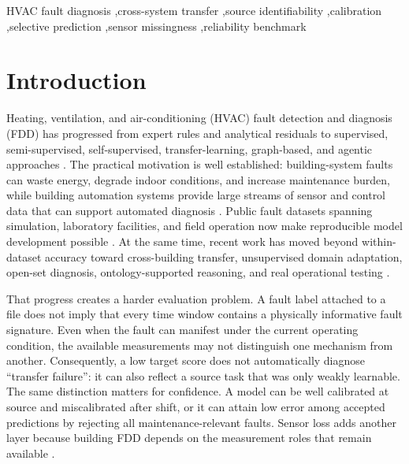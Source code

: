 \documentclass[preprint,12pt]{elsarticle}
\begin{document}
\begin{frontmatter}
\begin{abstract}
\end{abstract}

\begin{keyword}
HVAC fault diagnosis \sep cross-system transfer \sep source identifiability \sep calibration \sep selective prediction \sep sensor missingness \sep reliability benchmark
\end{keyword}

\end{frontmatter}

\section{Introduction}
Heating, ventilation, and air-conditioning (HVAC) fault detection and diagnosis (FDD) has progressed from expert rules and analytical residuals to supervised, semi-supervised, self-supervised, transfer-learning, graph-based, and agentic approaches \cite{katipamula2005a,katipamula2005b,kim2018review,mirnaghi2020review,chen2022review,chen2023review,bi2024review}. The practical motivation is well established: building-system faults can waste energy, degrade indoor conditions, and increase maintenance burden, while building automation systems provide large streams of sensor and control data that can support automated diagnosis \cite{shi2019review,andersen2024barriers}. Public fault datasets spanning simulation, laboratory facilities, and field operation now make reproducible model development possible \cite{granderson2023dataset}. At the same time, recent work has moved beyond within-dataset accuracy toward cross-building transfer, unsupervised domain adaptation, open-set diagnosis, ontology-supported reasoning, and real operational testing \cite{lei2025,zhang2025source,ghalamsiah2025can,ghalamsiah2026graph,gao2026open,li2026agentic,wang2026cross,mosteiro2026dbn}.

That progress creates a harder evaluation problem. A fault label attached to a file does not imply that every time window contains a physically informative fault signature. Even when the fault can manifest under the current operating condition, the available measurements may not distinguish one mechanism from another. Consequently, a low target score does not automatically diagnose ``transfer failure'': it can also reflect a source task that was only weakly learnable. The same distinction matters for confidence. A model can be well calibrated at source and miscalibrated after shift, or it can attain low error among accepted predictions by rejecting all maintenance-relevant faults. Sensor loss adds another layer because building FDD depends on the measurement roles that remain available \cite{zhang2021sensor,hu2025sensorreview,li2025voting}.
\end{document}
